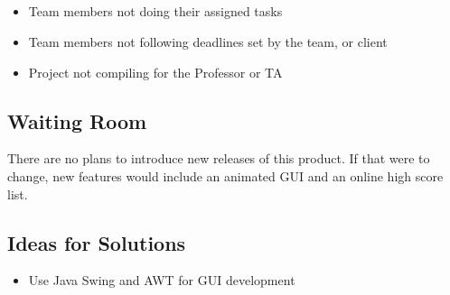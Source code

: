 \documentclass[12pt]{article}
\begin{document}
\subsection{\color{red}{Risks}}
\begin{itemize}
    \color{red}
    \item Team members not doing their assigned tasks
    \item Team members not following deadlines set by the team, or client
    \item Project not compiling for the Professor or TA
\end{itemize}

\subsection{Waiting Room}
There are no plans to introduce new releases of this product. If that were to change, new features would include an animated GUI and an online high score list.

\subsection{Ideas for Solutions}
\begin{itemize}
	\item Use Java Swing and AWT for GUI development
\end{itemize}
\end{document}
